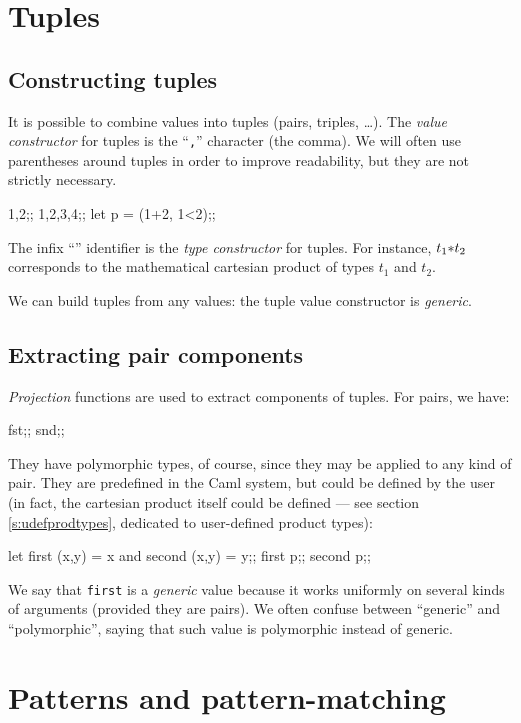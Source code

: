 \section{Tuples}

\subsection{Constructing tuples}

It is possible to combine values into tuples (pairs, triples, \ldots).
The {\em value constructor} for
tuples is the ``{\tt,}'' character (the comma). We will often use parentheses
around tuples in order to improve readability, but they are not strictly
necessary.
\begin{caml_example}
1,2;;
1,2,3,4;;
let p = (1+2, 1<2);;
\end{caml_example}
The infix ``{\tt *}'' identifier is the {\em type constructor} for tuples.
For instance, $t_1 {\tt *} t_2$ corresponds to the mathematical cartesian product of types $t_1$ and $t_2$.

We can build tuples from any values: the tuple value constructor is {\em
generic}.

\subsection{Extracting pair components}

{\em Projection} functions are used to extract components of tuples. For pairs, we have:
\begin{caml_example}
fst;;
snd;;
\end{caml_example}
They have polymorphic types, of course, since they may be applied to
any kind of pair.  They are predefined in the Caml system, but could
be defined by the user (in fact, the cartesian product itself could be
defined --- see section \ref{s:udefprodtypes}, dedicated to user-defined
product types):
\begin{caml_example}
let first (x,y) = x
and second (x,y) = y;;
first p;;
second p;;
\end{caml_example}
We say that \verb|first| is a {\em generic} value because it works
uniformly on several kinds of arguments (provided they are pairs). We
often confuse between ``generic'' and ``polymorphic'', saying that
such value is polymorphic instead of generic.


\section{Patterns and pattern-matching}

